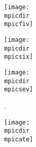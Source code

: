 \begin{figure}
\begin{adjustbox}{minipage=7.0in,frame}
\begin{subfigure}[t]{.45\linewidth}
    \texttt{[image: \\mpicdir\\mpicfiv]}
\end{subfigure}%
\begin{subfigure}[t]{.45\linewidth}
    \centering
    \captionsetup[subfigure]{}
    \caption{\mcapsix}\label{\mlabsix}
    \vspace{-3mm}
    \texttt{[image: \\mpicdir\\mpicsix]}
\end{subfigure}%
\vspace{0mm}
\begin{subfigure}[t]{.45\linewidth}
    \centering
    \captionsetup[subfigure]{}
    \caption{\mcapsev.}\label{\mlabsev}
    \texttt{[image: \\mpicdir\\mpicsev]}
\end{subfigure}%
\begin{subfigure}[t]{.45\linewidth}
    \centering
    \captionsetup[subfigure]{}
    \caption{\mcapate}\label{\mlabate}
    \vspace{-3mm}
    \texttt{[image: \\mpicdir\\mpicate]}
\end{subfigure}%

\caption{\textbf{\mcapbig} \\
}\label{\mlabbig}
\end{adjustbox}
\end{figure}
